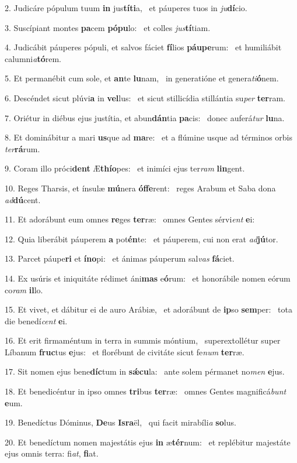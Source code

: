 2. Judicáre pópulum tuum \textbf{in} jus\textbf{tí}\textbf{ti}a, \ast\  et páuperes tuos in \textit{ju}\textbf{dí}cio.\

3. Suscípiant montes \textbf{pa}cem \textbf{pó}\textbf{pu}lo: \ast\  et colles \textit{jus}\textbf{tí}tiam.\

4. Judicábit páuperes pópuli, et salvos fáciet \textbf{fí}lios \textbf{páu}\textbf{pe}rum: \ast\  et humiliábit calumni\textit{a}\textbf{tó}rem.\

5. Et permanébit cum sole, et \textbf{an}te \textbf{lu}nam, \ast\  in generatióne et genera\textit{ti}\textbf{ó}nem.\

6. Descéndet sicut plúvi\textbf{a} in \textbf{vel}lus: \ast\  et sicut stillicídia stillántia su\textit{per} \textbf{ter}ram.\

7. Oriétur in diébus ejus justítia, et abun\textbf{dán}tia \textbf{pa}cis: \ast\  donec auferá\textit{tur} \textbf{lu}na.\

8. Et dominábitur a mari \textbf{us}que ad \textbf{ma}re: \ast\  et a flúmine usque ad términos orbis \textit{ter}\textbf{rá}rum.\

9. Coram illo próci\textbf{dent} Æ\textbf{thí}\textbf{o}pes: \ast\  et inimíci ejus ter\textit{ram} \textbf{lin}gent.\

10. Reges Tharsis, et ínsulæ \textbf{mú}nera \textbf{óf}\textbf{fe}rent: \ast\  reges Arabum et Saba dona \textit{ad}\textbf{dú}cent.\

11. Et adorábunt eum omnes \textbf{re}ges \textbf{ter}ræ: \ast\  omnes Gentes sérvi\textit{ent} \textbf{e}i:\

12. Quia liberábit páuperem \textbf{a} pot\textbf{én}te: \ast\  et páuperem, cui non erat \textit{ad}\textbf{jú}tor.\

13. Parcet páupe\textbf{ri} et \textbf{ín}\textbf{o}pi: \ast\  et ánimas páuperum sal\textit{vas} \textbf{fá}ciet.\

14. Ex usúris et iniquitáte rédimet áni\textbf{mas} e\textbf{ó}rum: \ast\  et honorábile nomen eórum co\textit{ram} \textbf{il}lo.\

15. Et vivet, et dábitur ei de auro Arábiæ, \dag\  et adorábunt de \textbf{ip}so \textbf{sem}per: \ast\  tota die benedí\textit{cent} \textbf{e}i.\

16. Et erit firmaméntum in terra in summis móntium, \dag\  superextollétur super Líbanum \textbf{fruc}tus \textbf{e}jus: \ast\  et florébunt de civitáte sicut fe\textit{num} \textbf{ter}ræ.\

17. Sit nomen ejus bene\textbf{díc}tum in \textbf{sǽ}\textbf{cu}la: \ast\  ante solem pérmanet no\textit{men} \textbf{e}jus.\

18. Et benedicéntur in ipso omnes \textbf{tri}bus \textbf{ter}ræ: \ast\  omnes Gentes magnificá\textit{bunt} \textbf{e}um.\

19. Benedíctus Dóminus, \textbf{De}us \textbf{Is}\textbf{ra}ël, \ast\  qui facit mirabíli\textit{a} \textbf{so}lus.\

20. Et benedíctum nomen majestátis ejus \textbf{in} æ\textbf{tér}num: \ast\  et replébitur majestáte ejus omnis terra: fi\textit{at}, \textbf{fi}at.\

